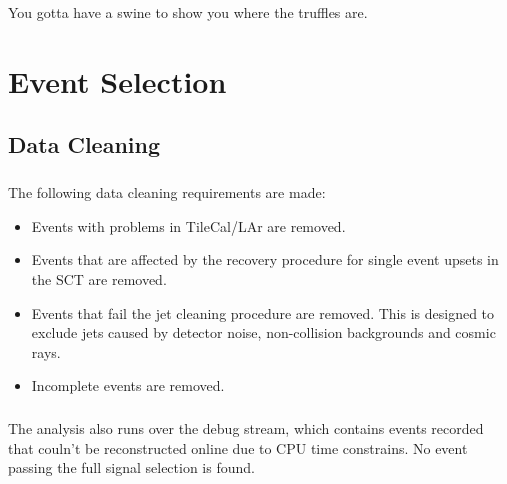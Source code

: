 \begin{savequote}[75mm]
You gotta have a swine to show you where the truffles are.
\end{savequote}

\chapter{Event Selection}
\label{sec:selection}

\section{Data Cleaning}
\label{evt-sel:cleaning}
\paragraph{}
The following data cleaning requirements are made:
\begin{itemize}
\item Events with problems in TileCal/LAr are removed.
\item Events that are affected by the recovery procedure for single event upsets in the SCT are removed.
\item Events that fail the jet cleaning procedure are removed. This is designed to exclude jets caused by detector noise, non-collision backgrounds and cosmic rays. 
\item Incomplete events are removed.
\end{itemize}
\paragraph{}
The analysis also runs over the debug stream, which contains events recorded that couln't be reconstructed online due to CPU time constrains. No event passing the full signal selection is found.


